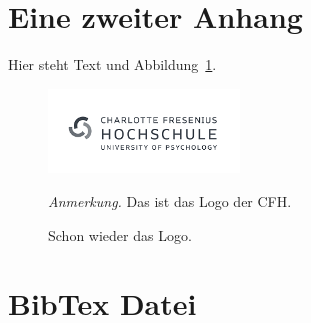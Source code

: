 \documentclass[
  stu,
  floatsintext,
  longtable,
  a4paper,
  nolmodern,
  notxfonts,
  notimes,
  donotrepeattitle,
  colorlinks=true,linkcolor=blue,citecolor=blue,urlcolor=blue]{apa7}
\begin{document}
\newpage

\section{Eine zweiter Anhang}\label{eine-zweiter-anhang}

Hier steht Text und Abbildung~\ref{fig-logo5}.

\begin{figure}[h]

{\caption{{Schon wieder das Logo.}{\label{fig-logo5}}}}

\includegraphics[width=2in,height=\textheight]{logo.png}

{\noindent \emph{Anmerkung.} Das ist das Logo der CFH.}

\end{figure}

\newpage

\section{BibTex Datei}\label{sec-bibtexdatei}
\end{document}
